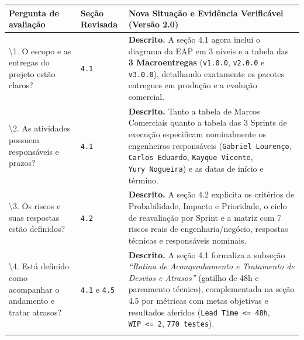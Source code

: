 {\footnotesize
\begin{tabularx}{\textwidth}{>{\fontSemiBold\color{BrandNavy}\hsize\sloppy\arraybackslash}X C{1.70cm} >{\hsize\sloppy\arraybackslash}X}
\toprule
{}
\textbf{Pergunta de avaliação} & \textbf{Seção Revisada} & \textbf{Nova Situação e Evidência Verificável (Versão 2.0)} \\
\midrule
{}
\textbackslash1. O escopo e as entregas do projeto estão claros? & \texttt{4.1} & \textbf{Descrito.} A seção 4.1 agora inclui o diagrama da EAP em 3 níveis e a tabela das \textbf{3 Macroentregas} (\texttt{v1.0.0}, \texttt{v2.0.0} e \texttt{v3.0.0}), detalhando exatamente os pacotes entregues em produção e a evolução comercial. \\
\midrule
\textbackslash2. As atividades possuem responsáveis e prazos? & \texttt{4.1} & \textbf{Descrito.} Tanto a tabela de Marcos Comerciais quanto a tabela das 3 Sprints de execução especificam nominalmente os engenheiros responsáveis (\texttt{Gabriel\ Lourenço}, \texttt{Carlos\ Eduardo}, \texttt{Kayque\ Vicente}, \texttt{Yury\ Nogueira}) e as datas de início e término. \\
\midrule
\textbackslash3. Os riscos e suas respostas estão definidos? & \texttt{4.2} & \textbf{Descrito.} A seção 4.2 explicita os critérios de Probabilidade, Impacto e Prioridade, o ciclo de reavaliação por Sprint e a matriz com 7 riscos reais de engenharia/negócio, respostas técnicas e responsáveis nominais. \\
\midrule
\textbackslash4. Está definido como acompanhar o andamento e tratar atrasos? & \texttt{4.1} e \texttt{4.5} & \textbf{Descrito.} A seção 4.1 formaliza a subseção \emph{``Rotina de Acompanhamento e Tratamento de Desvios e Atrasos''} (gatilho de 48h e pareamento técnico), complementada na seção 4.5 por métricas com metas objetivas e resultados aferidos (\texttt{Lead\ Time\ \textless{}=\ 48h}, \texttt{WIP\ \textless{}=\ 2}, \texttt{770\ testes}). \\
\bottomrule
\end{tabularx}%
}
